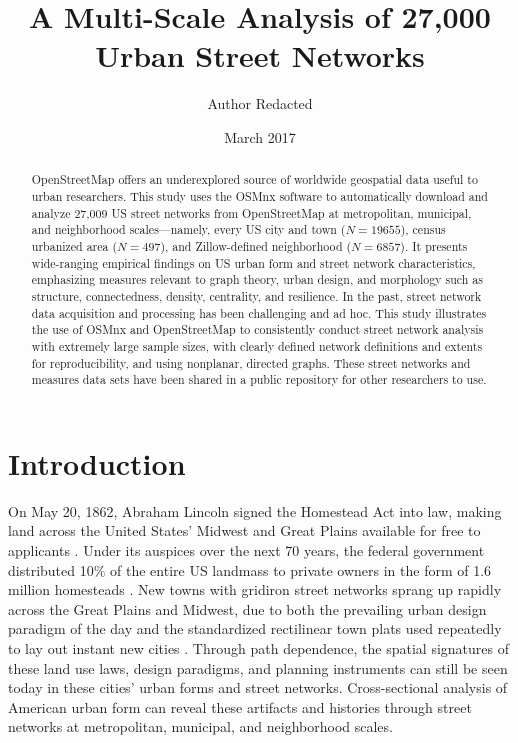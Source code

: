 \documentclass[Afour,sageh,times]{sagej}
\renewcommand{\cite}{\citep}
\begin{document}
\title{A Multi-Scale Analysis of 27,000 Urban Street Networks}
\author{Author Redacted}
\date{March 2017}
\maketitle



\begin{abstract}
	
OpenStreetMap offers an underexplored source of worldwide geospatial data useful to urban researchers. This study uses the OSMnx software to automatically download and analyze 27,009 US street networks from OpenStreetMap at metropolitan, municipal, and neighborhood scales---namely, every US city and town ($N=19655$), census urbanized area ($N=497$), and Zillow-defined neighborhood ($N=6857$). It presents wide-ranging empirical findings on US urban form and street network characteristics, emphasizing measures relevant to graph theory, urban design, and morphology such as structure, connectedness, density, centrality, and resilience. In the past, street network data acquisition and processing has been challenging and ad hoc. This study illustrates the use of OSMnx and OpenStreetMap to consistently conduct street network analysis with extremely large sample sizes, with clearly defined network definitions and extents for reproducibility, and using nonplanar, directed graphs. These street networks and measures data sets have been shared in a public repository for other researchers to use.

\end{abstract}



\section{Introduction}

On May 20, 1862, Abraham Lincoln signed the Homestead Act into law, making land across the United States' Midwest and Great Plains available for free to applicants \cite{porterfield_homestead_2005}. Under its auspices over the next 70 years, the federal government distributed 10\% of the entire US landmass to private owners in the form of 1.6 million homesteads \cite{lee_kansas_1979, sherraden_inclusion_2005}. New towns with gridiron street networks sprang up rapidly across the Great Plains and Midwest, due to both the prevailing urban design paradigm of the day and the standardized rectilinear town plats used repeatedly to lay out instant new cities \cite{southworth_streets_1997}. Through path dependence, the spatial signatures of these land use laws, design paradigms, and planning instruments can still be seen today in these cities' urban forms and street networks. Cross-sectional analysis of American urban form can reveal these artifacts and histories through street networks at metropolitan, municipal, and neighborhood scales.
\end{document}
